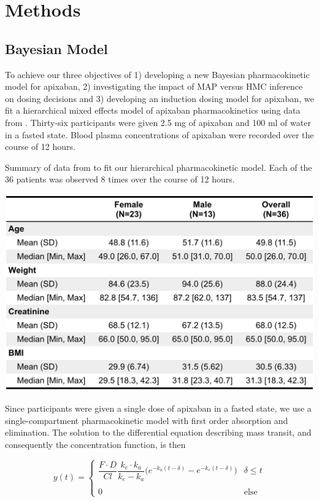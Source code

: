 \section{Methods}

\subsection*{Bayesian Model}

To achieve our three objectives of 1) developing a new Bayesian pharmacokinetic model for apixaban, 2) investigating the impact of MAP versus HMC inference on dosing decisions and 3) developing an induction dosing model for apixaban, we fit a hierarchical mixed effects model of apixaban pharmacokinetics using data from \cite{Beaton2018-el}.  Thirty-six participants were given 2.5 mg of apixaban and 100 ml of water in a fasted state. Blood plasma concentrations of apixaban were recorded over the course of 12 hours.



\begin{table}[htb]
	\centering
	\caption{Summary of data from  \cite{Beaton2018-el} to fit our hierarchical pharmacokinetic model.  Each of the 36 patients was observed 8 times over the course of 12 hours. } 
	\label{tab:my table} 
	\includegraphics[width=0.7\linewidth]{figures/table1}
\end{table}


\noindent Since participants were given a single dose of apixaban in a fasted state, we use a single-compartment pharmacokinetic model with first order absorption and elimination.  The solution to the differential equation describing mass transit, and consequently the concentration function, is then


\begin{equation} \label{eq:eq_1}
y(t) =  \begin{cases}  \dfrac{F \cdot D}{\mathit{Cl}} \dfrac{k_e \cdot k_a}{k_e - k_a}\Bigg( e^{-k_a (t-\delta)} - e^{-k_e(t-\delta)} \Bigg)  & \delta \leq t\\\\ 0 & \mbox{else} \end{cases}
\end{equation}

